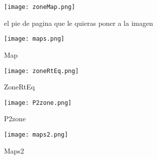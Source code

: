 \graphicspath{{../Graphics/Cpt2-InjectCW/}}


			\begin{figure}[H]
				\centering
				\texttt{[image: zoneMap.png]}
				\caption{\label{Img:widgets}el pie de pagina que le quieras 	poner a la imagen}
			\end{figure}

			\begin{figure}[H]
				\centering
				\texttt{[image: maps.png]}
				\caption{\label{fig:map}Map}	
			\end{figure}

			\begin{figure}[H]
				\centering
				\texttt{[image: zoneRtEq.png]}
				\caption{\label{fig:zoneRtEq}ZoneRtEq}	
			\end{figure}

			\begin{figure}[H]
				\centering
				\texttt{[image: P2zone.png]}
				\caption{\label{fig:P2zone}P2zone}	
			\end{figure}

			\begin{figure}[H]
				\centering
				\texttt{[image: maps2.png]}
				\caption{\label{fig:maps2}Maps2}	
			\end{figure}
